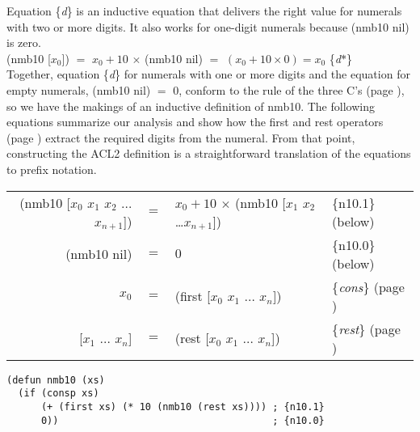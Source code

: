 \vspace{-1mm}   %
Equation \{\emph{d}\} is an inductive equation that delivers the right value for
numerals with two or more digits. It also works
for one-digit numerals because (nmb10 nil) is zero.\\
\hspace*{1cm}
\textsf{(nmb10 [$x_0$])} $=$ $x_0 + 10$ $\times$ \textsf{(nmb10 nil)} $=$ $(x_0 + 10 \times 0) = x_0$ \hfill \{\emph{d}$*$\}\\

Together, equation \{\emph{d}\} for numerals with one or more digits
and the equation for empty numerals, \textsf{(nmb10 nil)} $=$ $0$, conform to the
rule of the three C's (page \pageref{fig:inductive-def-keys}),
so we have the makings of an inductive definition of \textsf{nmb10}.
The following equations summarize our analysis and show how
the \textsf{first} and \textsf{rest} operators
(page \pageref{first-rest-cons})
extract the required digits from the numeral.
From that point, constructing the ACL2 definition
is a straightforward translation of the equations to prefix notation.
\vspace{2mm}   %
\begin{center}
\addtolength{\tabcolsep}{-3pt}
\begin{tabular}{rlll}
\textsf{(nmb10 [$x_0$ $x_1$ $x_2$ $\dots$ $x_{n+1}$])} & $=$ &$x_0 + 10$ $\times$ \textsf{(nmb10 [$x_1$ $x_2$ \dots $x_{n+1}$])} &\{n10.1\} (below)\\
\textsf{(nmb10 nil)}                           & $=$ &$0$   &\{n10.0\} (below)\\
$x_0$                         & $=$ &\textsf{(first [$x_0$ $x_1$ $\dots$ $x_n$])} &\{\emph{cons}\} (page \pageref{first-rest-cons})\\
\textsf{{[$x_1$ $\dots$ $x_n$]}}       & $=$ &\textsf{(rest  [$x_0$ $x_1$ $\dots$ $x_n$])} &\{\emph{rest}\} (page \pageref{first-rest-cons})\\ %
\end{tabular}
\addtolength{\tabcolsep}{3pt}
\end{center}\label{nmb10-defun}
\vspace{-2mm}   %
\begin{code}
\begin{verbatim}
(defun nmb10 (xs)
  (if (consp xs)
      (+ (first xs) (* 10 (nmb10 (rest xs)))) ; {n10.1}
      0))                                     ; {n10.0}
\end{verbatim}
\end{code}

